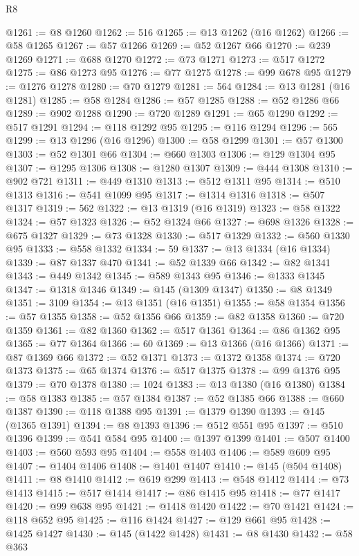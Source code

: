 \begin{lexlean}{R8}
\begin{coremodule}
@1261 := @8 @1260
@1262 := 516
@1265 := @13 @1262 (@16 @1262)
@1266 := @58 @1265
@1267 := @57 @1266
@1269 := @52 @1267 @66
@1270 := @239 @1269
@1271 := @688 @1270
@1272 := @73 @1271
@1273 := @517 @1272
@1275 := @86 @1273 @95
@1276 := @77 @1275
@1278 := @99 @678 @95
@1279 := @1276 @1278
@1280 := @70 @1279
@1281 := 564
@1284 := @13 @1281 (@16 @1281)
@1285 := @58 @1284
@1286 := @57 @1285
@1288 := @52 @1286 @66
@1289 := @902 @1288
@1290 := @720 @1289
@1291 := @65 @1290
@1292 := @517 @1291
@1294 := @118 @1292 @95
@1295 := @116 @1294
@1296 := 565
@1299 := @13 @1296 (@16 @1296)
@1300 := @58 @1299
@1301 := @57 @1300
@1303 := @52 @1301 @66
@1304 := @660 @1303
@1306 := @129 @1304 @95
@1307 := @1295 @1306
@1308 := @1280 @1307
@1309 := @444 @1308
@1310 := @902 @721
@1311 := @449 @1310
@1313 := @512 @1311 @95
@1314 := @510 @1313
@1316 := @541 @1099 @95
@1317 := @1314 @1316
@1318 := @507 @1317
@1319 := 562
@1322 := @13 @1319 (@16 @1319)
@1323 := @58 @1322
@1324 := @57 @1323
@1326 := @52 @1324 @66
@1327 := @698 @1326
@1328 := @675 @1327
@1329 := @73 @1328
@1330 := @517 @1329
@1332 := @560 @1330 @95
@1333 := @558 @1332
@1334 := 59
@1337 := @13 @1334 (@16 @1334)
@1339 := @87 @1337 @470
@1341 := @52 @1339 @66
@1342 := @82 @1341
@1343 := @449 @1342
@1345 := @589 @1343 @95
@1346 := @1333 @1345
@1347 := @1318 @1346
@1349 := @145 (@1309 @1347)
@1350 := @8 @1349
@1351 := 3109
@1354 := @13 @1351 (@16 @1351)
@1355 := @58 @1354
@1356 := @57 @1355
@1358 := @52 @1356 @66
@1359 := @82 @1358
@1360 := @720 @1359
@1361 := @82 @1360
@1362 := @517 @1361
@1364 := @86 @1362 @95
@1365 := @77 @1364
@1366 := 60
@1369 := @13 @1366 (@16 @1366)
@1371 := @87 @1369 @66
@1372 := @52 @1371
@1373 := @1372 @1358
@1374 := @720 @1373
@1375 := @65 @1374
@1376 := @517 @1375
@1378 := @99 @1376 @95
@1379 := @70 @1378
@1380 := 1024
@1383 := @13 @1380 (@16 @1380)
@1384 := @58 @1383
@1385 := @57 @1384
@1387 := @52 @1385 @66
@1388 := @660 @1387
@1390 := @118 @1388 @95
@1391 := @1379 @1390
@1393 := @145 (@1365 @1391)
@1394 := @8 @1393
@1396 := @512 @551 @95
@1397 := @510 @1396
@1399 := @541 @584 @95
@1400 := @1397 @1399
@1401 := @507 @1400
@1403 := @560 @593 @95
@1404 := @558 @1403
@1406 := @589 @609 @95
@1407 := @1404 @1406
@1408 := @1401 @1407
@1410 := @145 (@504 @1408)
@1411 := @8 @1410
@1412 := @619 @299
@1413 := @548 @1412
@1414 := @73 @1413
@1415 := @517 @1414
@1417 := @86 @1415 @95
@1418 := @77 @1417
@1420 := @99 @638 @95
@1421 := @1418 @1420
@1422 := @70 @1421
@1424 := @118 @652 @95
@1425 := @116 @1424
@1427 := @129 @661 @95
@1428 := @1425 @1427
@1430 := @145 (@1422 @1428)
@1431 := @8 @1430
@1432 := @58 @363

\end{coremodule}
\end{lexlean}
